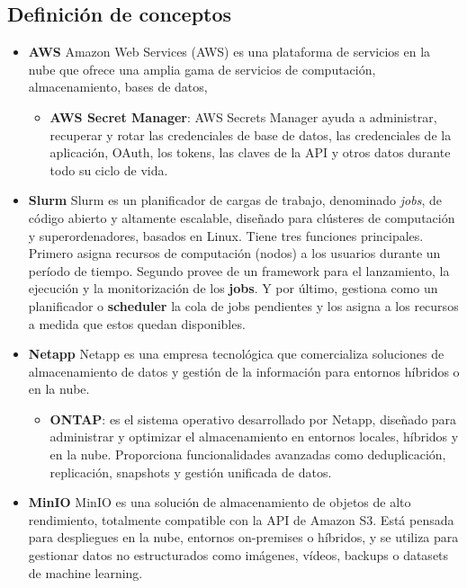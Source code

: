 \subsection{Definición de conceptos}
\begin{itemize}
    \item \textbf{AWS} \newline
    Amazon Web Services (AWS) es una plataforma de servicios en la nube que ofrece una amplia gama de servicios de computación, almacenamiento, bases de datos,
    \begin{itemize}
        \item \textbf{AWS Secret Manager}: AWS Secrets Manager ayuda a administrar, recuperar y rotar las credenciales de base de datos, 
        las credenciales de la aplicación, OAuth, los tokens, las claves de la API y otros datos durante todo su ciclo de vida.
    \end{itemize}
   
    \item \textbf{Slurm} \newline
    Slurm es un planificador de cargas de trabajo, denominado \textit{jobs}, de código abierto y altamente escalable, diseñado para 
    clústeres de computación y superordenadores, basados en Linux. Tiene tres funciones principales. Primero asigna recursos 
    de computación (nodos) a los usuarios durante un período de tiempo. Segundo provee de un framework para el lanzamiento, 
    la ejecución y la monitorización de los \textbf{jobs}. Y por último, gestiona como un planificador o \textbf{scheduler} la cola de jobs 
    pendientes y los asigna a los recursos a medida que estos quedan disponibles.
    
    \item \textbf{Netapp} \newline
    Netapp es una empresa tecnológica que comercializa soluciones de almacenamiento de datos y gestión de la información para entornos híbridos o en la nube. 

    \begin{itemize}
        \item \textbf{ONTAP}: es el sistema operativo desarrollado por Netapp, diseñado para administrar y optimizar el almacenamiento 
        en entornos locales, híbridos y en la nube. Proporciona funcionalidades avanzadas como deduplicación, replicación, snapshots y gestión unificada de datos.
    \end{itemize}
    
    \item \textbf{MinIO} \newline
    MinIO es una solución de almacenamiento de objetos de alto rendimiento, totalmente compatible con la API de Amazon S3. Está pensada 
    para despliegues en la nube, entornos on-premises o híbridos, y se utiliza para gestionar datos no estructurados como imágenes, vídeos, backups o datasets de machine learning.


\end{itemize}
